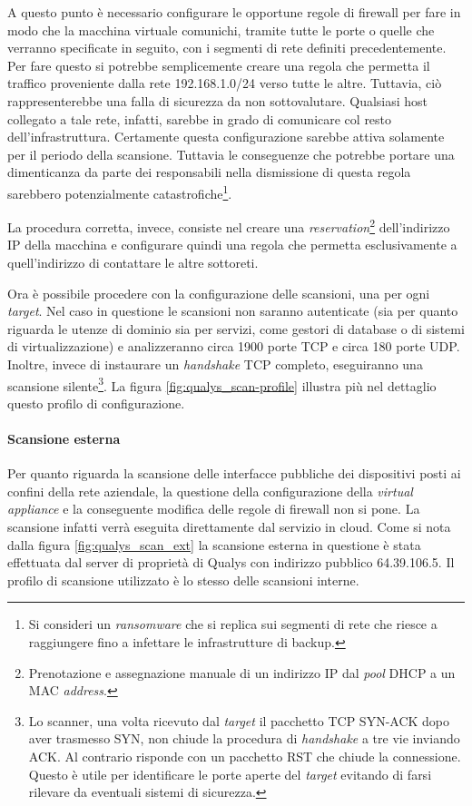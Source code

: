 \documentclass[target=bach,aauheader=]{thud}
\begin{document}
A questo punto è necessario configurare le opportune regole di firewall per fare in modo che la macchina virtuale comunichi, tramite tutte le porte o quelle che verranno specificate in seguito, con i segmenti di rete definiti precedentemente. Per fare questo si potrebbe semplicemente creare una regola che permetta il traffico proveniente dalla rete 192.168.1.0/24 verso tutte le altre. Tuttavia, ciò rappresenterebbe una falla di sicurezza da non sottovalutare. Qualsiasi host collegato a tale rete, infatti, sarebbe in grado di comunicare col resto dell'infrastruttura. Certamente questa configurazione sarebbe attiva solamente per il periodo della scansione. Tuttavia le conseguenze che potrebbe portare una dimenticanza da parte dei responsabili nella dismissione di questa regola sarebbero potenzialmente catastrofiche\footnote{Si consideri un \textit{ransomware} che si replica sui segmenti di rete che riesce a raggiungere fino a infettare le infrastrutture di backup.}.

La procedura corretta, invece, consiste nel creare una \textit{reservation}\footnote{Prenotazione e assegnazione manuale di un indirizzo IP dal \textit{pool} DHCP a un MAC \textit{address}.} dell'indirizzo IP della macchina e configurare quindi una regola che permetta esclusivamente a quell'indirizzo di contattare le altre sottoreti.

Ora è possibile procedere con la configurazione delle scansioni, una per ogni \textit{target}. Nel caso in questione le scansioni non saranno autenticate (sia per quanto riguarda le utenze di dominio sia per servizi, come gestori di database o di sistemi di virtualizzazione) e analizzeranno circa 1900 porte TCP e circa 180 porte UDP. Inoltre, invece di instaurare un \textit{handshake} TCP completo, eseguiranno una scansione silente\footnote{Lo scanner, una volta ricevuto dal \textit{target} il pacchetto TCP SYN-ACK dopo aver trasmesso SYN, non chiude la procedura di \textit{handshake} a tre vie inviando ACK. Al contrario risponde con un pacchetto RST che chiude la connessione. Questo è utile per identificare le porte aperte del \textit{target} evitando di farsi rilevare da eventuali sistemi di sicurezza.}. La figura \ref{fig:qualys_scan-profile} illustra più nel dettaglio questo profilo di configurazione.

\paragraph{Scansione esterna} Per quanto riguarda la scansione delle interfacce pubbliche dei dispositivi posti ai confini della rete aziendale, la questione della configurazione della \textit{virtual appliance} e la conseguente modifica delle regole di firewall non si pone. La scansione infatti verrà eseguita direttamente dal servizio in cloud. Come si nota dalla figura \ref{fig:qualys_scan_ext} la scansione esterna in questione è stata effettuata dal server di proprietà di Qualys con indirizzo pubblico 64.39.106.5. Il profilo di scansione utilizzato è lo stesso delle scansioni interne.
\end{document}
